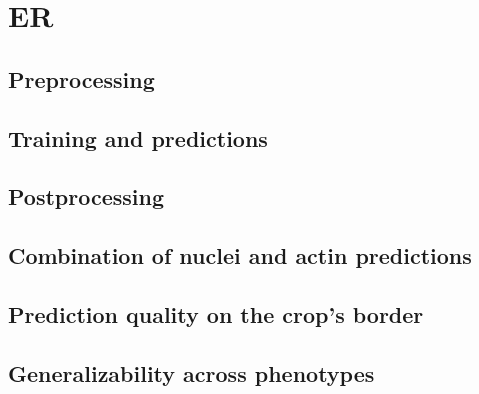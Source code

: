 \section{ER}
    \subsection{Preprocessing}
        
    \subsection{Training and predictions}
        
    \subsection{Postprocessing}
    \subsection{Combination of nuclei and actin predictions}
        
    \subsection{Prediction quality on the crop's border}
    \subsection{Generalizability across phenotypes}

